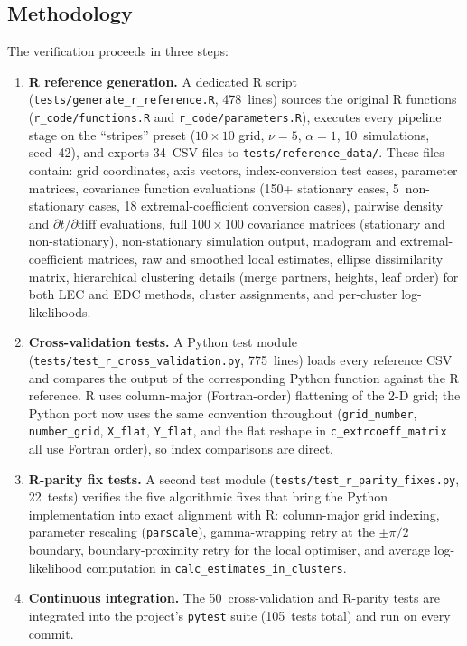 \documentclass[a4paper]{elsarticle}
\begin{document}
\subsection{Methodology}

The verification proceeds in three steps:

\begin{enumerate}
\item \textbf{R reference generation.}
  A dedicated R script (\texttt{tests/generate\_r\_reference.R},
  478~lines) sources the original R functions
  (\texttt{r\_code/functions.R} and \texttt{r\_code/parameters.R}),
  executes every pipeline stage on the ``stripes'' preset
  ($10 \times 10$ grid, $\nu = 5$, $\alpha = 1$, 10~simulations,
  seed~42), and exports 34~CSV files to
  \texttt{tests/reference\_data/}.
  These files contain: grid coordinates, axis vectors,
  index-conversion test cases, parameter matrices,
  covariance function evaluations (150+ stationary cases, 5~non-stationary cases,
  18 extremal-coefficient conversion cases),
  pairwise density and $\partial t/\partial\text{diff}$ evaluations,
  full $100 \times 100$ covariance matrices (stationary and non-stationary),
  non-stationary simulation output,
  madogram and extremal-coefficient matrices,
  raw and smoothed local estimates,
  ellipse dissimilarity matrix,
  hierarchical clustering details (merge partners, heights, leaf order)
  for both LEC and EDC methods,
  cluster assignments, and per-cluster log-likelihoods.

\item \textbf{Cross-validation tests.}
  A Python test module (\texttt{tests/test\_r\_cross\_validation.py},
  775~lines) loads every reference CSV and compares the output of the
  corresponding Python function against the R reference.
  R uses column-major (Fortran-order) flattening of the 2-D grid;
  the Python port now uses the same convention throughout
  (\texttt{grid\_number}, \texttt{number\_grid},
  \texttt{X\_flat}, \texttt{Y\_flat}, and the flat reshape
  in \texttt{c\_extrcoeff\_matrix} all use Fortran order),
  so index comparisons are direct.

\item \textbf{R-parity fix tests.}
  A second test module (\texttt{tests/test\_r\_parity\_fixes.py},
  22~tests) verifies the five algorithmic fixes that bring the
  Python implementation into exact alignment with R:
  column-major grid indexing, parameter rescaling (\texttt{parscale}),
  gamma-wrapping retry at the $\pm\pi/2$ boundary,
  boundary-proximity retry for the local optimiser,
  and average log-likelihood computation in
  \texttt{calc\_estimates\_in\_clusters}.

\item \textbf{Continuous integration.}
  The 50~cross-validation and R-parity tests are integrated into
  the project's \texttt{pytest} suite (105~tests total) and run on
  every commit.
\end{enumerate}
\end{document}
